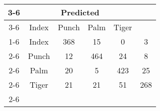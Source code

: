 \documentclass{standalone}
\begin{document}
 
 \begin{tabular}{|c |c |c |c |c |c |}
\cline{3-6}\multicolumn{2}{c|}{} & \multicolumn{4}{c|}{Predicted} \\ 
\cline{3-6} \multicolumn{2}{c |}{ } & Index & Punch & Palm & Tiger\\ 
\cline{1-6}\multirow{4}{*}{\rotatebox[origin=c]{90}{Actual}} & Index & 368 & 15 & 0 & 3\\ 
 \cline{2-6} & Punch & 12 & 464 & 24 & 8\\ 
 \cline{2-6} & Palm & 20 & 5 & 423 & 25\\ 
 \cline{2-6} & Tiger & 21 & 21 & 51 & 268\\ 
 \cline{2-6}\hline \end{tabular}
 
\end{document}
